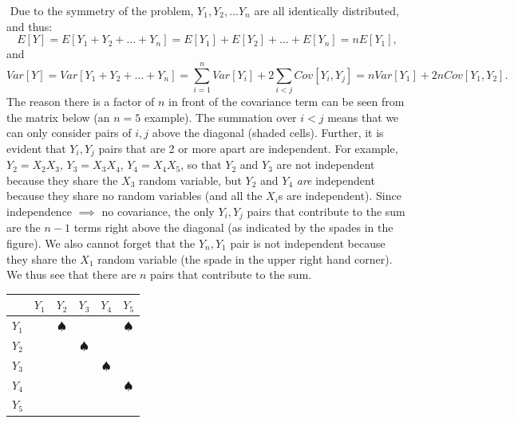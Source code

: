 \begin{problem}{4} $ $
Due to the symmetry of the problem, $Y_1, Y_2, \ldots Y_n$ are all identically distributed, and thus:
\begin{equation*}
E[Y] = E[Y_1+Y_2+\ldots +Y_n] = E[Y_1]+E[Y_2]+\ldots +E[Y_n]  = nE[Y_1],
\end{equation*}
and
\begin{equation*}
Var[Y] = Var[Y_1+Y_2+\ldots +Y_n] = \sum_{i=1}^n Var [Y_i]+2 \sum_{i<j} Cov[Y_i, Y_j]  = nVar[Y_1]+2 nCov[Y_1, Y_2].
\end{equation*}
The reason there is a factor of $n$ in front of the covariance term can be seen from the matrix below (an $n=5$ example).  The summation over $i<j$ means that we can only consider pairs of $i,j$ above the diagonal (shaded cells).  Further, it is evident that $Y_i, Y_j$ pairs that are 2 or more apart are independent.  For example, $Y_2=X_2X_3$, $Y_3=X_3X_4$, $Y_4=X_4X_5$, so that $Y_2$ and $Y_3$ are not independent because they share the $X_3$ random variable, but  $Y_2$ and $Y_4$ \textit{are} independent because they share no random variables (and all the $X_i$s are independent).  Since independence $\implies$ no covariance, the only $Y_i, Y_j$ pairs that contribute to the sum are the $n-1$ terms right above the diagonal (as indicated by the spades in the figure).  We also cannot forget that the $Y_n,Y_1$ pair is not independent because they share the $X_1$ random variable (the spade in the upper right hand corner).  We thus see that there are $n$ pairs that contribute to the sum.
\begin{center}
\bgroup
\def\arraystretch{1.5}
  \begin{tabular}{ | c | c | c | c | c | c |}
    \hline
     & $Y_1$ & $Y_2$& $Y_3$& $Y_4$& $Y_5$ \\  \hline
    $Y_1$ &\cellcolor{light-gray} &$\spadesuit$ & & &$\spadesuit$ \\ \hline
    $Y_2$ & &\cellcolor{light-gray} &$\spadesuit$ && \\ \hline
    $Y_3$ & & &\cellcolor{light-gray} & $\spadesuit$ & \\ \hline
     $Y_4$ & & & &\cellcolor{light-gray} & $\spadesuit$\\ \hline
     $Y_5$ & & & & &\cellcolor{light-gray} \\
    \hline
  \end{tabular}
  \egroup
\end{center}


\end{problem}
